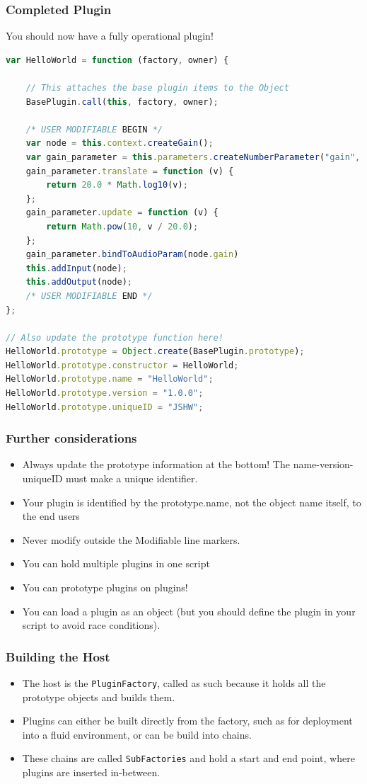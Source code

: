 \documentclass{beamer}
\begin{document}
\begin{frame}[fragile]
\frametitle{Completed Plugin}
You should now have a fully operational plugin!\\
\begin{lstlisting}[language=javascript,basicstyle=\tiny]
var HelloWorld = function (factory, owner) {

    // This attaches the base plugin items to the Object
    BasePlugin.call(this, factory, owner);

    /* USER MODIFIABLE BEGIN */
    var node = this.context.createGain();
    var gain_parameter = this.parameters.createNumberParameter("gain", 0, -12, 12);
    gain_parameter.translate = function (v) {
        return 20.0 * Math.log10(v);
    };
    gain_parameter.update = function (v) {
        return Math.pow(10, v / 20.0);
    };
    gain_parameter.bindToAudioParam(node.gain)
    this.addInput(node);
    this.addOutput(node);
    /* USER MODIFIABLE END */
};

// Also update the prototype function here!
HelloWorld.prototype = Object.create(BasePlugin.prototype);
HelloWorld.prototype.constructor = HelloWorld;
HelloWorld.prototype.name = "HelloWorld";
HelloWorld.prototype.version = "1.0.0";
HelloWorld.prototype.uniqueID = "JSHW";
\end{lstlisting}
\end{frame}

\begin{frame}
\frametitle{Further considerations}
\begin{itemize}
\item Always update the prototype information at the bottom! The name-version-uniqueID must make a unique identifier.
\item Your plugin is identified by the prototype.name, not the object name itself, to the end users
\item Never modify outside the Modifiable line markers.
\item You can hold multiple plugins in one script
\item You can prototype plugins on plugins!
\item You can load a plugin as an object (but you should define the plugin in your script to avoid race conditions).
\end{itemize}
\end{frame}

\begin{frame}
\frametitle{Building the Host}
\begin{itemize}
\item The host is the \texttt{PluginFactory}, called as such because it holds all the prototype objects and builds them.
\item Plugins can either be built directly from the factory, such as for deployment into a fluid environment, or can be build into chains.
\item These chains are called \texttt{SubFactories} and hold a start and end point, where plugins are inserted in-between.
\end{itemize}
\end{frame}
\end{document}
